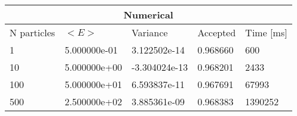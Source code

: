 \begin{tabular}{|l|l|l|l|l|}
\hline 
\multicolumn{5}{|c|}{Numerical}\\ 
\hline 
N particles & $<E>$ & Variance & Accepted & Time [ms]\\ 
 \hline 
1 & 5.000000e-01 & 3.122502e-14 & 0.968660 & 600 \\ 
\hline10 & 5.000000e+00 & -3.304024e-13 & 0.968201 & 2433 \\ 
\hline100 & 5.000000e+01 & 6.593837e-11 & 0.967691 & 67993 \\ 
\hline500 & 2.500000e+02 & 3.885361e-09 & 0.968383 & 1390252 \\ 
\hline\end{tabular}